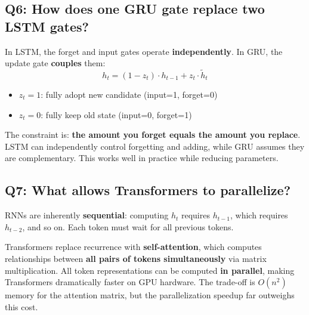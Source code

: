 \documentclass[11pt,a4paper]{article}
\begin{document}
\subsection*{Q6: How does one GRU gate replace two LSTM gates?}

In LSTM, the forget and input gates operate \textbf{independently}. In GRU, the update gate \textbf{couples} them:
\[
h_t = (1 - z_t) \cdot h_{t-1} + z_t \cdot \tilde{h}_t
\]

\begin{itemize}[leftmargin=1.5em]
    \item $z_t = 1$: fully adopt new candidate (input=1, forget=0)
    \item $z_t = 0$: fully keep old state (input=0, forget=1)
\end{itemize}

The constraint is: \textbf{the amount you forget equals the amount you replace}. LSTM can independently control forgetting and adding, while GRU assumes they are complementary. This works well in practice while reducing parameters.

\subsection*{Q7: What allows Transformers to parallelize?}

RNNs are inherently \textbf{sequential}: computing $h_t$ requires $h_{t-1}$, which requires $h_{t-2}$, and so on. Each token must wait for all previous tokens.

Transformers replace recurrence with \textbf{self-attention}, which computes relationships between \textbf{all pairs of tokens simultaneously} via matrix multiplication. All token representations can be computed \textbf{in parallel}, making Transformers dramatically faster on GPU hardware. The trade-off is $O(n^2)$ memory for the attention matrix, but the parallelization speedup far outweighs this cost.
\end{document}
